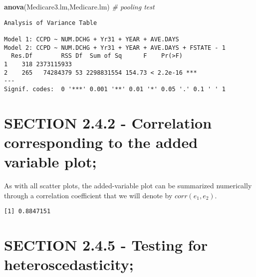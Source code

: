 \documentclass[]{book}
\newenvironment{Shaded}{\begin{snugshade}}{\end{snugshade}}
\newcommand{\CommentTok}[1]{\textcolor[rgb]{0.56,0.35,0.01}{\textit{#1}}}
\newcommand{\KeywordTok}[1]{\textcolor[rgb]{0.13,0.29,0.53}{\textbf{#1}}}
\newcommand{\NormalTok}[1]{#1}
\newcommand{\OperatorTok}[1]{\textcolor[rgb]{0.81,0.36,0.00}{\textbf{#1}}}
\begin{document}
\begin{Shaded}
\begin{Highlighting}[]
\KeywordTok{anova}\NormalTok{(Medicare3.lm,Medicare.lm) }\CommentTok{# pooling test}
\end{Highlighting}
\end{Shaded}

\begin{verbatim}
Analysis of Variance Table

Model 1: CCPD ~ NUM.DCHG + Yr31 + YEAR + AVE.DAYS
Model 2: CCPD ~ NUM.DCHG + Yr31 + YEAR + AVE.DAYS + FSTATE - 1
  Res.Df        RSS Df  Sum of Sq      F    Pr(>F)    
1    318 2373115933                                   
2    265   74284379 53 2298831554 154.73 < 2.2e-16 ***
---
Signif. codes:  0 '***' 0.001 '**' 0.01 '*' 0.05 '.' 0.1 ' ' 1
\end{verbatim}

\hypertarget{section-2.4.2---correlation-corresponding-to-the-added-variable-plot}{%
\section{SECTION 2.4.2 - Correlation corresponding to the added variable plot;}\label{section-2.4.2---correlation-corresponding-to-the-added-variable-plot}}

As with all scatter plots, the added-variable plot can be summarized numerically through a correlation coefficient that we will denote by \(corr(e_1, e_2)\).

\begin{Shaded}
\end{Shaded}

\begin{verbatim}
[1] 0.8847151
\end{verbatim}

\hypertarget{section-2.4.5---testing-for-heteroscedasticity}{%
\section{SECTION 2.4.5 - Testing for heteroscedasticity;}\label{section-2.4.5---testing-for-heteroscedasticity}}
\end{document}
